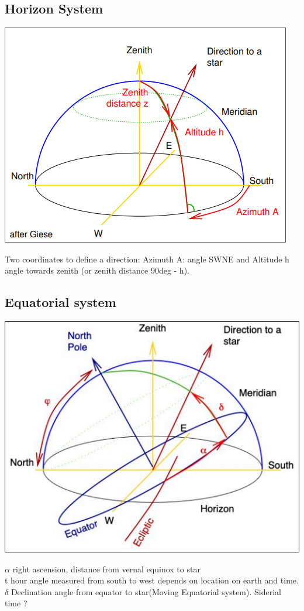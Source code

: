 \documentclass[11pt,a4paper]{article}
\begin{document}
\subsection{Horizon System}
\begin{center}
    \includegraphics[width=0.6\linewidth]{screenshot_2024-01-13-201929.png}
\end{center}
Two coordinates to define a direction:
Azimuth A: angle SWNE and Altitude h angle towards zenith (or zenith distance 90deg - h). 
\subsection{Equatorial system}
\begin{center}
    \includegraphics[width=0.6\linewidth]{screenshot_2024-01-13-202353.png}\\
\end{center}
$\alpha$ right ascension, distance from vernal equinox to star \\ 
t hour angle measured from south to west depends on location on earth and time.
$\delta$ Declination angle from equator to star(Moving Equatorial system). 
Siderial time ?
\end{document}
